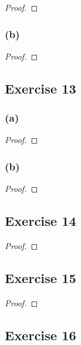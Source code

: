 \documentclass[14pt]{extarticle}
\begin{document}
\begin{proof}

\end{proof}

\subsubsection{(b)}

\begin{proof}

\end{proof}

\subsection{Exercise 13}

\subsubsection{(a)}

\begin{proof}

\end{proof}

\subsubsection{(b)}

\begin{proof}

\end{proof}

\subsection{Exercise 14}

\begin{proof}

\end{proof}

\subsection{Exercise 15}

\begin{proof}

\end{proof}

\subsection{Exercise 16}
\end{document}
